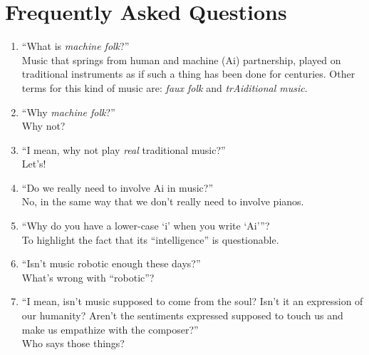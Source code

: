\documentclass[a4paper,notitlepage,twoside]{book}
\begin{document}
\section{Frequently Asked Questions}
\begin{enumerate}
\item ``What is {\em machine folk}?''\\
Music that springs from human and machine (Ai) partnership,
played on traditional instruments as if such a thing has been done for centuries.
Other terms for this kind of music are: {\em faux folk} and {\em trAiditional music}. 
\item ``Why {\em machine folk}?''\\
Why not?
\item ``I mean, why not play {\em real} traditional music?''\\
Let's!
\item ``Do we really need to involve Ai in music?''\\ 
No, in the same way that we don't really need to involve pianos. 
\item ``Why do you have a lower-case `i' when you write `Ai'''?\\
To highlight the fact that its ``intelligence'' is questionable.
\item ``Isn't music robotic enough these days?'' \\
What's wrong with ``robotic''?
\item ``I mean, isn't music supposed to come from the soul? Isn't it an expression of our humanity? Aren't the sentiments expressed supposed to touch us and make us empathize with the composer?'' \\
Who says those things? %

\end{enumerate}
\end{document}
